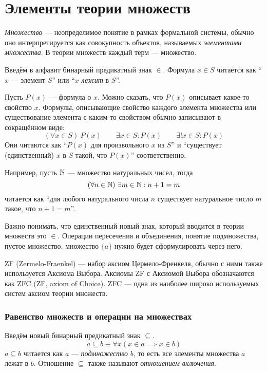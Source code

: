 \part{Элементы теории множеств}

{\it Множество} --- неопределимое понятие в рамках формальной системы,
обычно оно интерпретируется как совокупность объектов,
называемых {\it элементами множества}.
В теории множеств каждый терм --- множество.

Введём в алфавит бинарный предикатный знак $\in$. Формула ${x\in S}$ читается
как ``$x$ --- элемент $S$'' или ``$x$ {\it лежит}
 в $S$''.

Пусть $P(x)$ --- формула о $x$. Можно сказать, что $P(x)$ описывает какое-то
свойство $x$.
Формулы, описывающие свойство каждого элемента множества или
существование элемента с каким-то свойством обычно записывают в сокращённом виде:
\[
  (\forall x\in S)~P(x)\qquad
  \exists x\in S:P(x)\qquad \exists!x\in S:P(x)
\]
Они читаются как ``$P(x)$ для произвольного $x$ из $S$'' и
``существует (единственный) $x$ в $S$ такой, что $P(x)$'' соответственно.

Например, пусть $\mathbb N$ --- множество натуральных чисел, тогда
\[
  (\forall n\in\mathbb N)~\exists m\in\mathbb N:n+1=m
\]
читается как ``для любого натурального числа $n$ существует натуральное число
$m$ такое, что $n+1=m$''.

Важно понимать, что единственный новый знак, который вводится в теории множеств
это $\in$. Операции пересечения и объединения, понятие подмножества, пустое множество,
множество $\{a\}$ нужно будет сформулировать через него.

ZF (Zermelo-Fraenkel) --- набор аксиом
Цермело-Френкеля, обычно с ними также
используется Аксиома Выбора. Аксиомы ZF с Аксиомой Выбора
обозначаются как ZFC (ZF, axiom of Choice).
ZFC --- одна из наиболее широко используемых систем аксиом теории множеств.

\section{Равенство множеств и операции на множествах}

Введём новый бинарный предикатный знак $\subseteq$.
\[
  a\subseteq b\equiv \forall x(x\in a\implies x\in b)
\]
${a\subseteq b}$ читается как $a$ --- {\it подмножество}
 $b$, то есть все
элементы множества $a$ лежат в $b$. Отношение $\subseteq$ также называют
{\it отношением включения}.


